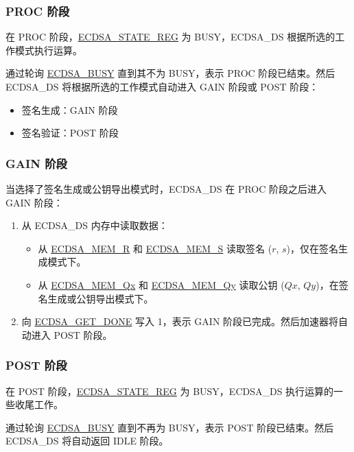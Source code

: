 \documentclass[main\_\_CN.tex]{subfiles}
\begin{document}
\subsubsection{PROC 阶段}

在 PROC 阶段，\hyperref[regdesc:ECDSASTATEREG]{ECDSA\_STATE\_REG} 为 BUSY，ECDSA\_DS 根据所选的工作模式执行运算。

通过轮询 \hyperref[fielddesc:ECDSABUSY]{ECDSA\_BUSY} 直到其不为 BUSY，表示 PROC 阶段已结束。然后 ECDSA\_DS 将根据所选的工作模式自动进入 GAIN 阶段或 POST 阶段：
\begin{itemize}
    \item 签名生成：GAIN 阶段
    \item 签名验证：POST 阶段
 \end{itemize}

\subsubsection{GAIN 阶段}

当选择了签名生成或公钥导出模式时，ECDSA\_DS 在 PROC 阶段之后进入 GAIN 阶段：

\begin{enumerate}
	\item 从 ECDSA\_DS 内存中读取数据：
	      \begin{itemize}
		      \item 从 \hyperref[tab:ecdsa-memory]{ECDSA\_MEM\_R} 和 \hyperref[tab:ecdsa-memory]{ECDSA\_MEM\_S} 读取签名 ($r$, $s$)，仅在签名生成模式下。
		      \item 从 \hyperref[tab:ecdsa-memory]{ECDSA\_MEM\_Qx} 和 \hyperref[tab:ecdsa-memory]{ECDSA\_MEM\_Qy} 读取公钥 ($Qx$, $Qy$)，在签名生成或公钥导出模式下。
	      \end{itemize}
	\item 向 \hyperref[fielddesc:ECDSAGETDONE]{ECDSA\_GET\_DONE} 写入 1，表示 GAIN 阶段已完成。然后加速器将自动进入 POST 阶段。
\end{enumerate}

\subsubsection{POST 阶段}

在 POST 阶段，\hyperref[regdesc:ECDSASTATEREG]{ECDSA\_STATE\_REG} 为 BUSY，ECDSA\_DS 执行运算的一些收尾工作。

通过轮询 \hyperref[fielddesc:ECDSABUSY]{ECDSA\_BUSY} 直到不再为 BUSY，表示 POST 阶段已结束。然后 ECDSA\_DS 将自动返回 IDLE 阶段。
\end{document}
